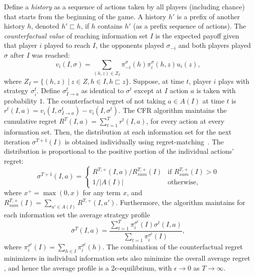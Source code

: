 Define a {\it history} as a sequence of actions taken by all players (including chance) that starts from the beginning of the game. 
A history $h'$ is a prefix of another history $h$, denoted $h' \sqsubset h$, if $h$ contains $h'$ (as a prefix sequence of actions).  
The {\it counterfactual value} of reaching information set $I$ is the expected payoff given that player $i$ played to reach $I$, the opponents played
$\sigma_{-i}$ and both players played $\sigma$ after $I$ was reached:
\begin{equation}
\label{eq:cfv}
v_i(I,\sigma) = \sum_{(h,z) \in Z_I} \pi^{\sigma}_{-i}(h) \pi^{\sigma}_{i}(h,z) u_i(z), 
\end{equation}
where $Z_I = \{ (h,z)~|~z \in Z, h \in I, h \sqsubset z \}$.
Suppose, at time $t$, player $i$ plays with strategy $\sigma^t_i$.
Define $\sigma^t_{I \rightarrow a}$ as identical to $\sigma^t$ except at $I$ action $a$ is taken with probability $1$.
The counterfactual regret of not taking $a \in A(I)$ at time $t$ is $r^t(I,a) = v_i(I,\sigma^t_{I \rightarrow a}) - v_i(I,\sigma^t)$.
The CFR algorithm maintains the cumulative regret $R^T(I,a) = \sum_{t=1}^T r^t(I,a)$, for every action at every information set.
Then, the distribution at each information set for the next iteration $\sigma^{T+1}(I)$ is obtained individually using
regret-matching~\cite{Hart00}. The distribution is proportional to the positive portion of the individual actions' regret:
\begin{equation*}
\label{eq:rm}
\sigma^{T+1}(I,a) = \left\{
\begin{array}{ll}
R^{T,+}(I,a) / R^{T,+}_{sum}(I) & \mbox{if } R^{T,+}_{sum}(I) > 0 \\ 
1 / |A(I)|                   & \mbox{otherwise,}
\end{array} \right.
\end{equation*}
where $x^+ = \max(0,x)$ for any term $x$, and $R^{T,+}_{sum}(I) = \sum_{a' \in A(I)} R^{T,+}(I,a')$. 
Furthermore, the algorithm maintains for each information set the average   strategy profile
\begin{equation}
\bar{\sigma}^T(I,a) = \frac{\sum_{t=1}^T \pi^{\sigma^t}_i(I) \sigma^t(I,a)}{\sum_{t=1} \pi^{\sigma^t}_i(I)}, 
\end{equation}
where $\pi^{\sigma^t}_i(I) = \sum_{h \in I}\pi^{\sigma^t}_i(h)$.
The combination of the counterfactual regret minimizers in individual information sets also minimize the overall 
average regret \cite{CFR}, and hence the average profile is a  $2\epsilon$-equilibrium, with $\epsilon \rightarrow 0$
as $T \rightarrow \infty$.

